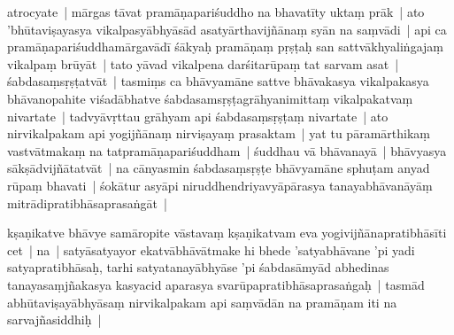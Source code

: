 \documentclass[article,12pt,a4paper]{memoir}%
\newcounter{parCount}
\begin{document}
	  \pstart \leavevmode%
	\label{thakur75-14.22}atrocyate | mārgas tāvat pramāṇapariśuddho na bhavatīty uktaṃ prāk | ato 'bhūtaviṣayasya vikalpasyābhyāsād asatyārthavijñānaṃ syān na saṃvādi | api ca pramāṇapariśuddhamārgavādī śākyaḥ pramāṇaṃ pṛṣṭaḥ san sattvākhyaliṅgajaṃ vikalpaṃ brūyāt | tato yāvad vikalpena darśitarūpaṃ tat sarvam asat | śabdasaṃsṛṣṭatvāt | tasmiṃs ca bhāvyamāne sattve bhāvakasya vikalpakasya bhāvanopahite viśadābhatve śabdasamsṛṣṭagrāhyanimittaṃ vikalpakatvaṃ nivartate | tadvyāvṛttau grāhyam api śabdasaṃsṛṣṭaṃ nivartate | ato nirvikalpakam api yogijñānaṃ nirviṣayaṃ prasaktam | yat tu pāramārthikaṃ vastvātmakaṃ na tatpramāṇapariśuddham | śuddhau vā bhāvanayā | bhāvyasya sākṣādvijñātatvāt | na cānyasmin śabdasaṃsṛṣṭe bhāvyamāne sphuṭam anyad rūpaṃ bhavati | śokātur asyāpi niruddhendriyavyāpārasya tanayabhāvanāyāṃ mitrādipratibhāsaprasaṅgāt | 
	{}
	\pend%
      

	  \pstart \leavevmode%
	\label{thakur75-15.4}kṣaṇikatve bhāvye samāropite vāstavaṃ kṣaṇikatvam eva yogivijñānapratibhāsīti cet | na | satyāsatyayor ekatvābhāvātmake hi bhede 'satyabhāvane 'pi yadi satyapratibhāsaḥ, tarhi satyatanayābhyāse 'pi śabdasāmyād abhedinas tanayasaṃjñakasya kasyacid aparasya svarūpapratibhāsaprasaṅgaḥ | tasmād abhūtaviṣayābhyāsaṃ nirvikalpakam api saṃvādān na pramāṇam iti na sarvajñasiddhiḥ | 
	{}
	\pend%
      
\end{document}
